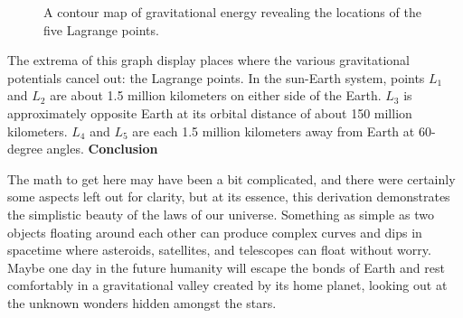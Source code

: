 \documentclass[10pt,a4paper]{article}
\begin{document}
\begin{figure}[h]
  \caption{A contour map of gravitational energy revealing the locations of the five Lagrange points.}
  \label{fig:3}
\end{figure}

The extrema of this graph display places where the various gravitational potentials cancel out: the Lagrange points. In the sun-Earth system, points $L_1$ and $L_2$ are about 1.5 million kilometers on either side of the Earth. $L_3$ is approximately opposite Earth at its orbital distance of about 150 million kilometers. $L_4$ and $L_5$ are each 1.5 million kilometers away from Earth at 60-degree angles.
\newline\newline
\textbf{Conclusion}
\newline

The math to get here may have been a bit complicated, and there were certainly some aspects left out for clarity, but at its essence, this derivation demonstrates the simplistic beauty of the laws of our universe. Something as simple as two objects floating around each other can produce complex curves and dips in spacetime where asteroids, satellites, and telescopes can float without worry. Maybe one day in the future humanity will escape the bonds of Earth and rest comfortably in a gravitational valley created by its home planet, looking out at the unknown wonders hidden amongst the stars. 
\end{document}
